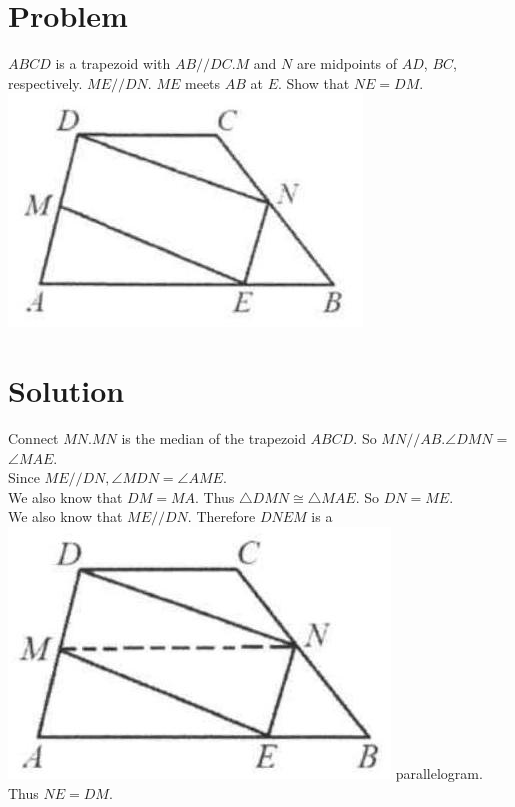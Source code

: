 \documentclass{article}
\begin{document}
\section*{Problem}
\(A B C D\) is a trapezoid with \(A B / / D C . M\) and \(N\) are midpoints of \(A D\), \(B C\), respectively. \(M E / / D N\). \(M E\) meets \(A B\) at \(E\). Show that \(N E=D M\).\\
\centering
\includegraphics[width=\textwidth]{images/045(2).jpg}

\section*{Solution}
Connect \(M N . M N\) is the median of the trapezoid \(A B C D\). So \(M N / / A B . \angle D M N=\) \(\angle M A E\).\\
Since \(M E / / D N, \angle M D N=\angle A M E\).\\
We also know that \(D M=M A\). Thus \(\triangle D M N \cong \triangle M A E\). So \(D N=M E\).\\
We also know that \(M E / / D N\). Therefore \(D N E M\) is a\\
\includegraphics[width=\textwidth]{images/051.jpg} parallelogram. Thus \(N E=D M\).
\end{document}

